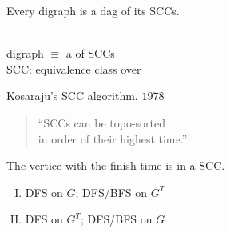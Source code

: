 
\begin{frame}{}
  \begin{theorem}
    Every digraph is a dag of its SCCs.
  \end{theorem}

  \pause
  \vspace{0.60cm}
  \begin{center}
     \\[10pt] 

    digraph $\equiv$ a  of SCCs \\[6pt]

    SCC: equivalence class over 
  \end{center}
\end{frame}
\begin{frame}{}
  \centerline{}

  \vspace{0.50cm}
  \begin{exampleblock}{Kosaraju's SCC algorithm, $1978$}
    \begin{quote}
      \begin{center}
	{\large ``SCCs can be topo-sorted \\[3pt] in  order of their highest  time.''}
      \end{center}
    \end{quote}

    \pause
    \centerline{The vertice with the  finish time is in a  SCC.}
  \end{exampleblock}

  \pause
  \vspace{0.60cm}
  \begin{enumerate}[(I)]
    \centering
  \item DFS on $G$; \; DFS/BFS on $G^{T}$ \\[8pt]
      \pause
    \item DFS on $G^{T}$;\; DFS/BFS on $G$
  \end{enumerate}
\end{frame}
